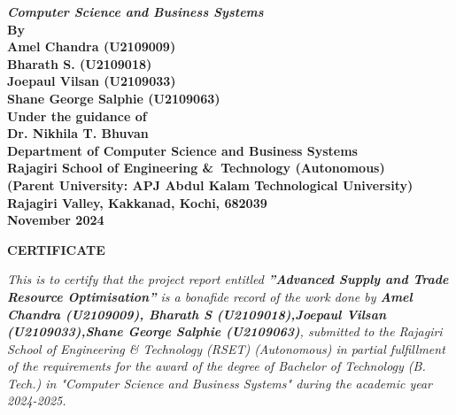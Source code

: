 \begin{center}
	{\Large \bf \itshape{{Computer Science and Business Systems}}}\\[1cm]
	\large \bfseries{By}\\[.2cm]
	\large \bfseries{Amel Chandra (U2109009)}\\[0.3cm]
	\large \bfseries{Bharath S. (U2109018)}\\[0.3cm]
	\large \bfseries{Joepaul Vilsan (U2109033)}\\[0.3cm]
	\large \bfseries{Shane George Salphie (U2109063)}\\[0.3cm]
	\large \bfseries{Under the guidance of}\\[0.5cm]
	\large \bfseries{Dr. Nikhila T. Bhuvan}\\[0.3cm]
	\large \textbf{Department of Computer Science and Business Systems}\\
	\large \textbf{Rajagiri School of Engineering \&\ Technology (Autonomous)}\\
	\small \bfseries{(Parent University: APJ Abdul Kalam Technological University)}\\
	\large \textbf{Rajagiri Valley, Kakkanad, Kochi, 682039}\\
	\large \bfseries{November 2024}
\end{center}

\newpage
\thispagestyle{empty}
\vspace{1cm}
\begin{center}

	\large \bfseries{\huge{CERTIFICATE}}\\[1cm]
\end{center}

\renewcommand{\baselinestretch}{1.2}\normalsize

\emph{This is to certify that the project report entitled \textbf{”Advanced Supply and Trade Resource Optimisation”} is a bonafide record of the work done by \textbf{Amel Chandra (U2109009), Bharath S (U2109018),Joepaul Vilsan (U2109033),Shane George Salphie (U2109063)}, submitted to the Rajagiri School of Engineering \& Technology (RSET) (Autonomous) in
	partial fulfillment of the requirements for the award of the degree of Bachelor of Technology (B. Tech.) in "Computer Science and Business Systems" during the academic year 2024-2025.}\\[2.5cm]

